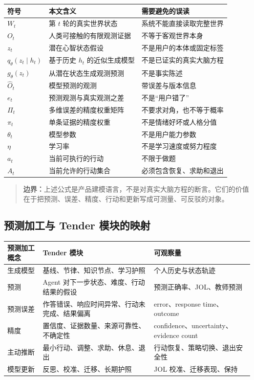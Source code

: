 \documentclass[UTF8,a4paper,11pt]{ctexart}
\newcommand{\boundary}[1]{\begin{quote}\noindent\textbf{\color{TenderPink}边界：}#1\end{quote}}
\begin{document}
\begin{center}
\begin{longtable}{@{}p{2.7cm}p{5.3cm}p{5.1cm}@{}}
\toprule
\textbf{符号} & \textbf{本文含义} & \textbf{需要避免的误读} \\
\midrule
\(W_t\) & 第 \(t\) 轮的真实世界状态 & 系统不能直接读取完整世界 \\
\(O_t\) & 人类可接触的有限观测证据 & 不等于客观世界本身 \\
\(z_t\) & 潜在心智状态假设 & 不是用户的本体或固定标签 \\
\(q_\theta(z_t\mid h_t)\) & 基于历史 \(h_t\) 的近似生成模型 & 不是已证实的真实大脑方程 \\
\(g_\theta(z_t)\) & 从潜在状态生成观测预测 & 不是事实陈述 \\
\(\hat O_t\) & 模型预测的观测 & 带误差与版本信息 \\
\(e_t\) & 预测观测与真实观测之差 & 不是“用户错了” \\
\(\Pi_t\) & 多维误差的精度权重矩阵 & 不要求对角，也不等于概率 \\
\(\pi_t\) & 单条证据的精度权重 & 不是情绪好坏或人格分值 \\
\(\theta_t\) & 模型参数 & 不是用户能力参数 \\
\(\eta\) & 学习率 & 不是学习速度或努力程度 \\
\(a_t\) & 当前可执行的行动 & 不限于做题 \\
\(A_t\) & 当前允许的行动集合 & 必须包含恢复、求助和退出 \\
\bottomrule
\end{longtable}
\end{center}

\boundary{上述公式是产品建模语言，不是对真实大脑方程的断言。它们的价值在于把预测、误差、精度、行动和更新写成可测量、可反驳的对象。}

\subsection{预测加工与 Tender 模块的映射}

\begin{center}
\begin{longtable}{@{}p{3.2cm}p{4.6cm}p{6.2cm}@{}}
\toprule
\textbf{预测加工概念} & \textbf{Tender 模块} & \textbf{可观察量} \\
\midrule
生成模型 & 基线、节律、知识节点、学习护照 & 个人历史与状态轨迹 \\
预测 & Agent 对下一步状态、难度、行动结果的假设 & 预测正确率、JOL、教师预测 \\
预测误差 & 作答错误、响应时间异常、行动未完成、结果偏离 & error、response time、outcome \\
精度 & 置信度、证据数量、来源可靠性、不确定性 & confidence、uncertainty、evidence count \\
主动推断 & 最小行动、调整、求助、休息、退出 & 行动恢复、策略切换、退出安全性 \\
模型更新 & 反思、校准、迁移、长期护照 & JOL 校准、迁移表现、保持 \\
\bottomrule
\end{longtable}
\end{center}
\end{document}
